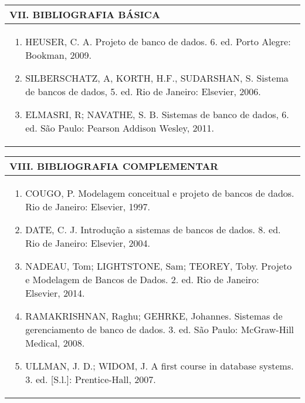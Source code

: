 \documentclass[12pt]{article}
\begin{document}
\begin{longtable}{|L{1.025\textwidth}|} \hline
%
{\bf VII. BIBLIOGRAFIA BÁSICA} \\ \hline
\begin{enumerate}
%
\item HEUSER, C. A. Projeto de banco de dados. 6. ed. Porto Alegre: Bookman, 2009. 
\item SILBERSCHATZ, A, KORTH, H.F., SUDARSHAN, S. Sistema de bancos de dados, 5. ed. Rio de Janeiro: Elsevier, 2006. 
\item ELMASRI, R; NAVATHE, S. B. Sistemas de banco de dados, 6. ed. São Paulo: Pearson Addison Wesley, 2011.%

\end{enumerate}
 \\ \hline
\end{longtable}



\begin{longtable}{|L{1.025\textwidth}|} \hline
%
{\bf VIII. BIBLIOGRAFIA COMPLEMENTAR} \\ \hline
\begin{enumerate}
\item COUGO, P. Modelagem conceitual e projeto de bancos de dados. Rio de Janeiro: Elsevier, 1997. 
\item DATE, C. J. Introdução a sistemas de bancos de dados. 8. ed. Rio de Janeiro: Elsevier, 2004. 
\item NADEAU, Tom; LIGHTSTONE, Sam; TEOREY, Toby. Projeto e Modelagem de Bancos de Dados. 2. ed. Rio de Janeiro: Elsevier, 2014. 
\item RAMAKRISHNAN, Raghu; GEHRKE, Johannes. Sistemas de gerenciamento de banco de dados. 3. ed. São Paulo: McGraw-Hill Medical, 2008. 
\item ULLMAN, J. D.; WIDOM, J. A first course in database systems. 3. ed. [S.l.]: Prentice-Hall, 2007.

%
\end{enumerate}
 \\ \hline
\end{longtable}



\end{document}
